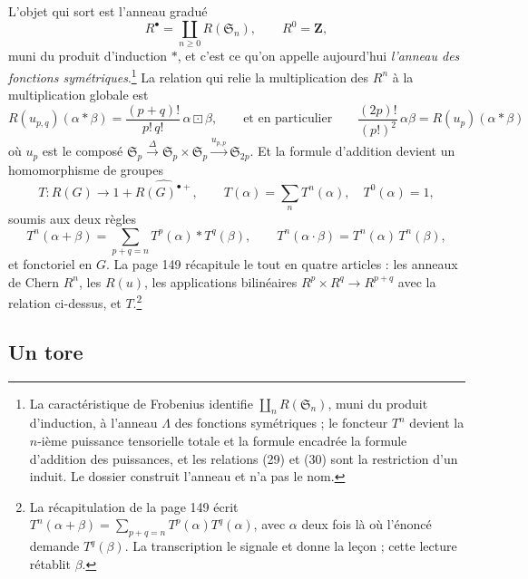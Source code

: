 \documentclass[11pt,a4paper]{article}
\begin{document}
L'objet qui sort est l'anneau gradué
\[
R^{\bullet} = \coprod_{n \geqslant 0} R(\mathfrak{S}_{n}) ,
\qquad R^{0} = \mathbf{Z} ,
\]
muni du produit d'induction $*$, et c'est ce qu'on appelle aujourd'hui
\emph{l'anneau des fonctions symétriques}.\footnote{La caractéristique de
Frobenius identifie $\coprod_{n}R(\mathfrak{S}_{n})$, muni du produit
d'induction, à l'anneau $\Lambda$ des fonctions symétriques ; le foncteur
$T^{n}$ devient la $n$-ième puissance tensorielle totale et la formule encadrée
la formule d'addition des puissances, et les relations (29) et (30) sont la
restriction d'un induit. Le dossier construit l'anneau et n'a pas le nom.} La
relation qui relie la multiplication des $R^{n}$ à la multiplication globale
est
\[
R(u_{p,q})(\alpha * \beta) = \frac{(p+q)!}{p!\,q!}\,\alpha \boxdot \beta ,
\qquad\text{et en particulier}\qquad
\frac{(2p)!}{(p!)^{2}}\,\alpha\beta = R(u_{p})(\alpha * \beta)
\]
où $u_{p}$ est le composé $\mathfrak{S}_{p} \xrightarrow{\Delta}
\mathfrak{S}_{p} \times \mathfrak{S}_{p} \xrightarrow{u_{p,p}}
\mathfrak{S}_{2p}$. Et la formule d'addition devient un homomorphisme de
groupes
\[
T \colon R(G) \longrightarrow 1 + \widehat{R(G)^{\bullet +}} ,
\qquad
T(\alpha) = \sum_{n} T^{n}(\alpha) , \quad T^{0}(\alpha) = 1 ,
\]
soumis aux deux règles
\[
T^{n}(\alpha + \beta) = \sum_{p+q=n} T^{p}(\alpha) * T^{q}(\beta) ,
\qquad
T^{n}(\alpha \cdot \beta) = T^{n}(\alpha)\,T^{n}(\beta) ,
\]
et fonctoriel en $G$. La page 149 récapitule le tout en quatre articles : les
anneaux de Chern $R^{n}$, les $R(u)$, les applications bilinéaires $R^{p}
\times R^{q} \to R^{p+q}$ avec la relation ci-dessus, et $T$.\footnote{La
récapitulation de la page 149 écrit $T^{n}(\alpha + \beta) = \sum_{p+q=n}
T^{p}(\alpha)T^{q}(\alpha)$, avec $\alpha$ deux fois là où l'énoncé demande
$T^{q}(\beta)$. La transcription le signale et donne la leçon ; cette lecture
rétablit $\beta$.}

\subsection*{Un tore}
\end{document}
